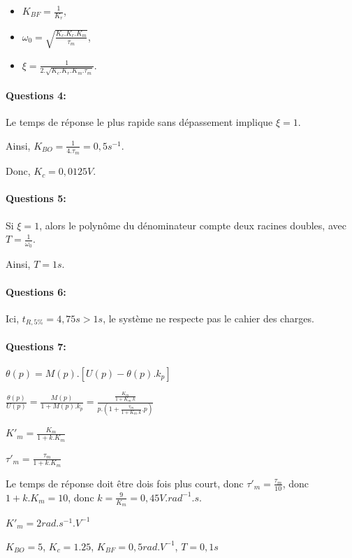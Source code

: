 \begin{itemize}
 \item $K_{BF}=\frac{1}{K_r}$,
 \item $\omega_0=\sqrt{\frac{K_c.K_r.K_m}{\tau_m}}$,
 \item $\xi=\frac{1}{2.\sqrt{K_c.K_r.K_m.\tau_m}}$.
\end{itemize}

\paragraph{Questions 4:}

Le temps de réponse le plus rapide sans dépassement implique $\xi=1$.

Ainsi, $K_{BO}=\frac{1}{4.\tau_m}=0,5s^{-1}$.

Donc, $K_c=0,0125V$.

\paragraph{Questions 5:}

Si $\xi=1$, alors le polynôme du dénominateur compte deux racines doubles, avec  $T=\frac{1}{\omega_0}$.

Ainsi, $T=1s$.

\paragraph{Questions 6:}

Ici, $t_{R,5\%}=4,75s>1s$, le système ne respecte pas le cahier des charges.

\paragraph{Questions 7:}

$\theta(p)=M(p).\left[U(p)-\theta(p).k_p\right]$

$\frac{\theta(p)}{U(p)}=\frac{M(p)}{1+M(p).k_p}=\frac{\frac{K_m}{1+K_m.k}}{p.(1+\frac{\tau_m}{1+K_m.k}.p)}$

$K'_m=\frac{K_m}{1+k.K_m}$

$\tau'_m=\frac{\tau_m}{1+k.K_m}$

Le temps de réponse doit être dois fois plus court, donc $\tau'_m=\frac{\tau_m}{10}$, donc $1+k.K_m=10$, donc $k=\frac{9}{K_m}=0,45V.rad^{-1}.s$.

$K'_m=2rad.s^{-1}.V^{-1}$

$K_{BO}=5$, $K_c=1.25$, $K_{BF}=0,5rad.V^{-1}$, $T=0,1s$

